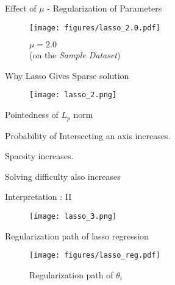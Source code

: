 \documentclass{beamer}
\begin{document}
\begin{frame}{Effect of $\mu$ - Regularization of Parameters}
\vspace{0.4cm}
\begin{figure}\texttt{[image: figures/lasso\_2.0.pdf]}\caption{$\mu = 2.0$\\(on the \emph{Sample Dataset})}
\end{figure}
\end{frame}

\begin{frame}{Why Lasso Gives Sparse solution}
\begin{figure}
    \centering
    \texttt{[image: lasso\_2.png]}
    \label{fig:my_label}
\end{figure}
\begin{itemize}
\small{
    \item Pointedness of $L_{p}$ norm 
    \item  Probability of Intersecting an axis increases.
    \item Sparsity increases. 
    \item Solving difficulty also increases
    }
\end{itemize}

\end{frame}

\begin{frame}{Interpretation : II}
\begin{figure}
    \centering
    \texttt{[image: lasso\_3.png]}
    \label{fig:my_label}
\end{figure}

\end{frame}




\begin{frame}{Regularization path of lasso regression}
\begin{figure}
    \centering
    \texttt{[image: figures/lasso\_reg.pdf]}
    \caption{Regularization path of $\theta_{i}$}
    \label{fig:my_label}
\end{figure}

\end{frame}
\end{document}
